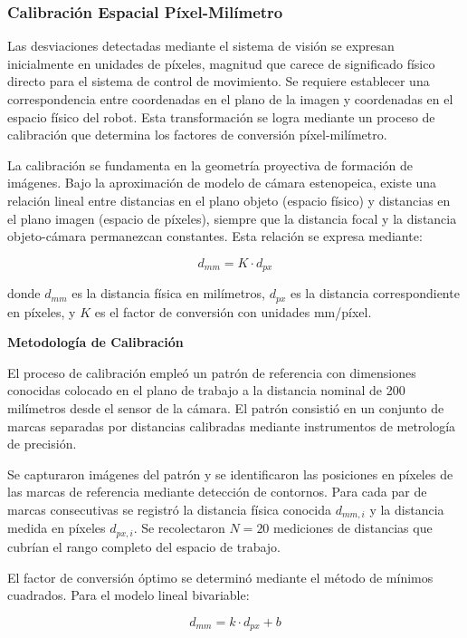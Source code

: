 \subsubsection{Calibración Espacial Píxel-Milímetro}

Las desviaciones detectadas mediante el sistema de visión se expresan inicialmente en unidades de píxeles, magnitud que carece de significado físico directo para el sistema de control de movimiento. Se requiere establecer una correspondencia entre coordenadas en el plano de la imagen y coordenadas en el espacio físico del robot. Esta transformación se logra mediante un proceso de calibración que determina los factores de conversión píxel-milímetro.

La calibración se fundamenta en la geometría proyectiva de formación de imágenes. Bajo la aproximación de modelo de cámara estenopeica, existe una relación lineal entre distancias en el plano objeto (espacio físico) y distancias en el plano imagen (espacio de píxeles), siempre que la distancia focal y la distancia objeto-cámara permanezcan constantes. Esta relación se expresa mediante:

\begin{equation}
d_{mm} = K \cdot d_{px}
\end{equation}

donde $d_{mm}$ es la distancia física en milímetros, $d_{px}$ es la distancia correspondiente en píxeles, y $K$ es el factor de conversión con unidades mm/píxel.

\textbf{Metodología de Calibración}

El proceso de calibración empleó un patrón de referencia con dimensiones conocidas colocado en el plano de trabajo a la distancia nominal de 200 milímetros desde el sensor de la cámara. El patrón consistió en un conjunto de marcas separadas por distancias calibradas mediante instrumentos de metrología de precisión.

Se capturaron imágenes del patrón y se identificaron las posiciones en píxeles de las marcas de referencia mediante detección de contornos. Para cada par de marcas consecutivas se registró la distancia física conocida $d_{mm,i}$ y la distancia medida en píxeles $d_{px,i}$. Se recolectaron $N = 20$ mediciones de distancias que cubrían el rango completo del espacio de trabajo.

El factor de conversión óptimo se determinó mediante el método de mínimos cuadrados. Para el modelo lineal bivariable:

\begin{equation}
d_{mm} = k \cdot d_{px} + b
\end{equation}

